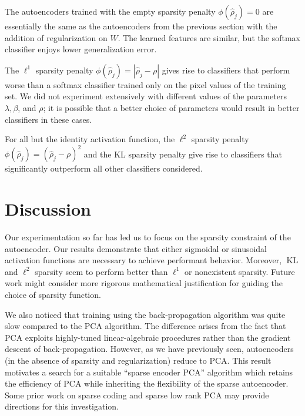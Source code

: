 \documentclass[twocolumn]{article}
\DeclareMathOperator{\KL}{KL}
\begin{document}
The autoencoders trained with the empty sparsity penalty $\phi(\hat\rho_j)=0$
are essentially the same as the autoencoders from the previous section with the
addition of regularization on $W$. The learned features are similar, but the
softmax classifier enjoys lower generalization error.

The $\ell^1$ sparsity penalty $\phi(\hat\rho_j)=|\hat\rho_j-\rho|$ gives rise
to classifiers that perform worse than a softmax classifier trained only on the
pixel values of the training set. We did not experiment extensively with different
values of the parameters $\lambda,\beta$, and $\rho$; it is possible that a better
choice of parameters would result in better classifiers in these cases.

For all but the identity activation function, 
the $\ell^2$ sparsity penalty $\phi(\hat\rho_j)=(\hat\rho_j-\rho)^2$ and the KL
sparsity penalty give rise to classifiers that significantly outperform all other
classifiers considered.

\section{Discussion}
Our experimentation so far has led us to focus on the sparsity constraint of the
autoencoder. Our results demonstrate that either sigmoidal or sinusoidal 
activation functions are necessary to achieve performant behavior. Moreover,
$\KL$ and $\ell^2$ sparsity seem to perform better than $\ell^1$ or nonexistent
sparsity. Future work might consider more rigorous mathematical justification
for guiding the choice of sparsity function.

We also noticed that training using the back-propagation algorithm
\cite{rumelhart2002learning} was quite slow compared to the PCA algorithm. The
difference arises from the fact that PCA exploits highly-tuned linear-algebraic
procedures rather than the gradient descent of back-propagation. However, as we
have previously seen, autoencoders (in the absence of sparsity and
regularization) reduce to PCA. This result motivates a search for a suitable
``sparse encoder PCA'' algorithm which retains the efficiency of PCA while
inheriting the flexibility of the sparse autoencoder. Some prior work on sparse
coding \cite{lee2007efficient} and sparse low rank PCA \cite{shen2008sparse} may
provide directions for this investigation.

\end{document}
